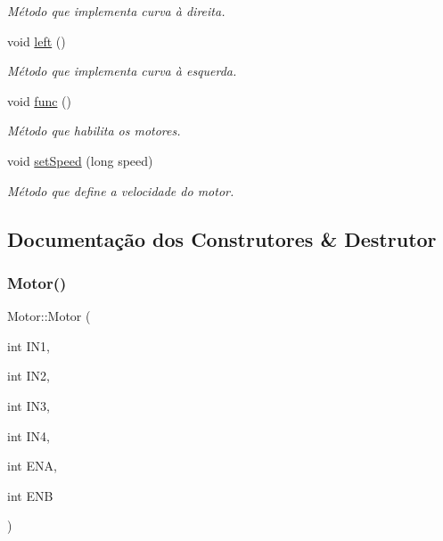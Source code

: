\begin{DoxyCompactItemize}
\begin{DoxyCompactList}\small\item\em Método que implementa curva à direita. \end{DoxyCompactList}\item 
\mbox{\label{class_motor_a8f22d8f53f3de51f68943c1294fcccfe}} 
void \mbox{\hyperlink{class_motor_a8f22d8f53f3de51f68943c1294fcccfe}{left}} ()
\begin{DoxyCompactList}\small\item\em Método que implementa curva à esquerda. \end{DoxyCompactList}\item 
\mbox{\label{class_motor_a362010c96401c127c31dc76bf4d73628}} 
void \mbox{\hyperlink{class_motor_a362010c96401c127c31dc76bf4d73628}{func}} ()
\begin{DoxyCompactList}\small\item\em Método que habilita os motores. \end{DoxyCompactList}\item 
void \mbox{\hyperlink{class_motor_ae5c87c52d273c73979a6c225e123425b}{set\+Speed}} (long speed)
\begin{DoxyCompactList}\small\item\em Método que define a velocidade do motor. \end{DoxyCompactList}\end{DoxyCompactItemize}


\subsection{Documentação dos Construtores \& Destrutor}
\mbox{\label{class_motor_adffd8a4eee235c6f4ac2e226febdb2ed}} 
\subsubsection{\texorpdfstring{Motor()}{Motor()}}
{\footnotesize\ttfamily Motor\+::\+Motor (\begin{DoxyParamCaption}\item[{int}]{I\+N1,  }\item[{int}]{I\+N2,  }\item[{int}]{I\+N3,  }\item[{int}]{I\+N4,  }\item[{int}]{E\+NA,  }\item[{int}]{E\+NB }\end{DoxyParamCaption})}



